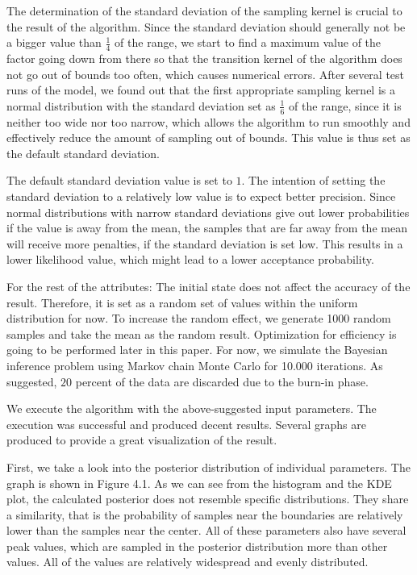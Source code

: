 The determination of the standard deviation of the sampling kernel is crucial to the result of the algorithm. Since the standard deviation should generally not be a bigger value than $\frac 1 4$ of the range,\cite{good_standard_deviation} we start to find a maximum value of the factor going down from there so that the transition kernel of the algorithm does not go out of bounds too often, which causes numerical errors. After several test runs of the model, we found out that the first appropriate sampling kernel is a normal distribution with the standard deviation set as $\frac 1 6$ of the range, since it is neither too wide nor too narrow, which allows the algorithm to run smoothly and effectively reduce the amount of sampling out of bounds. This value is thus set as the default standard deviation.

The default standard deviation value is set to $1$. The intention of setting the standard deviation to a relatively low value is to expect better precision. Since normal distributions with narrow standard deviations give out lower probabilities if the value is away from the mean, the samples that are far away from the mean will receive more penalties, if the standard deviation is set low. This results in a lower likelihood value, which might lead to a lower acceptance probability.

For the rest of the attributes: The initial state does not affect the accuracy of the result\cite{mcmc_practice}. Therefore, it is set as a random set of values within the uniform distribution for now. To increase the random effect, we generate 1000 random samples and take the mean as the random result. Optimization for efficiency is going to be performed later in this paper. For now, we simulate the Bayesian inference problem using Markov chain Monte Carlo for 10.000 iterations. As suggested, $20$ percent of the data are discarded due to the burn-in phase.\cite{20per_burnin}


We execute the algorithm with the above-suggested input parameters. The execution was successful and produced decent results. Several graphs are produced to provide a great visualization of the result. 

First, we take a look into the posterior distribution of individual parameters. The graph is shown in Figure 4.1. As we can see from the histogram and the KDE plot, the calculated posterior does not resemble specific distributions. They share a similarity, that is the probability of samples near the boundaries are relatively lower than the samples near the center. All of these parameters also have several peak values, which are sampled in the posterior distribution more than other values. All of the values are relatively widespread and evenly distributed. 

